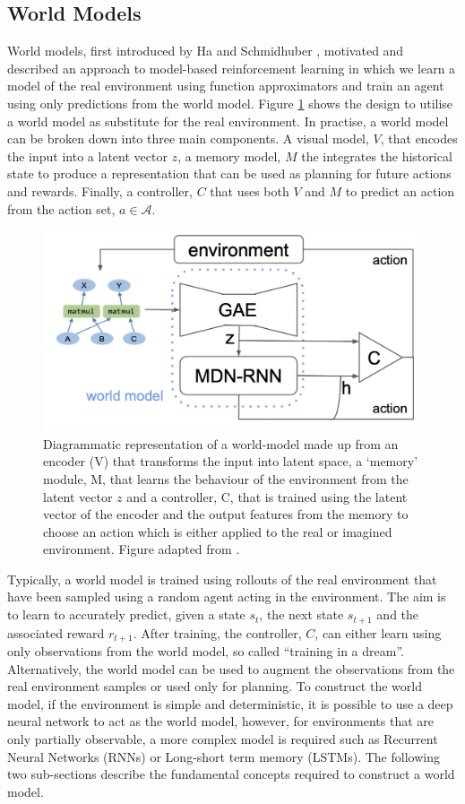 \subsection{World Models}
World models, first introduced by Ha and Schmidhuber \cite{ha2018worldmodels}, motivated and described an approach to model-based reinforcement learning in which we learn a model of the real environment using function approximators and train an agent using only predictions from the world model. Figure \ref{fig:bg:mb-rl} shows the design to utilise a world model as substitute for the real environment. In practise, a world model can be broken down into three main components. A visual model, $V$, that encodes the input into a latent vector $z$, a memory model, $M$ the integrates the historical state to produce a representation that can be used as planning for future actions and rewards. Finally, a controller, $C$ that uses both $V$ and $M$ to predict an action from the action set, $a \in \mathcal{A}$.

\begin{figure}[ht]
  \centering
  \includegraphics[width=0.75\columnwidth]{sections/2background/images/mb-rl.png}
  \caption[Model-based Reinforcement Learning End-To-End System]{Diagrammatic representation of a world-model made up from an encoder (V) that transforms the input into latent space, a `memory' module, M, that learns the behaviour of the environment from the latent vector $z$ and a controller, C, that is trained using the latent vector of the encoder and the output features from the memory to choose an action which is either applied to the real or imagined environment. Figure adapted from \cite{ha2018worldmodels}.}
  \label{fig:bg:mb-rl}
\end{figure}

Typically, a world model is trained using rollouts of the real environment that have been sampled using a random agent acting in the environment. The aim is to learn to accurately predict, given a state $s_t$, the next state $s_{t+1}$ and the associated reward $r_{t+1}$. After training, the controller, $C$, can either learn using only observations from the world model, so called ``training in a dream''. Alternatively, the world model can be used to augment the observations from the real environment samples or used only for planning. To construct the world model, if the environment is simple and deterministic, it is possible to use a deep neural network to act as the world model, however, for environments that are only partially observable, a more complex model is required such as Recurrent Neural Networks (RNNs) or Long-short term memory (LSTMs). The following two sub-sections describe the fundamental concepts required to construct a world model.

